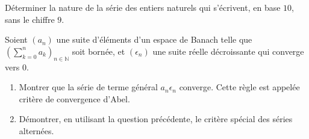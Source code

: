 \begin{exer}
Déterminer la nature de la série des entiers naturels qui s'écrivent, en base $10$, sans le chiffre $9$.
\end{exer}

\begin{exer}
Soient $(a_n)$ une suite d'éléments d'un espace de Banach telle que %
$\left(\sum\limits_{k=0}^n a_k\right)_{n \in \mathbb{N}}$ soit bornée, %
et $(\epsilon_n)$ une suite réelle décroissante qui converge vers $0$.
\begin{enumerate}
\item Montrer que la série de terme général $a_n \epsilon_n$ converge. Cette règle est appelée critère de convergence d'Abel.
\item Démontrer, en utilisant la question précédente, le critère spécial des séries alternées.
\end{enumerate}
\end{exer}